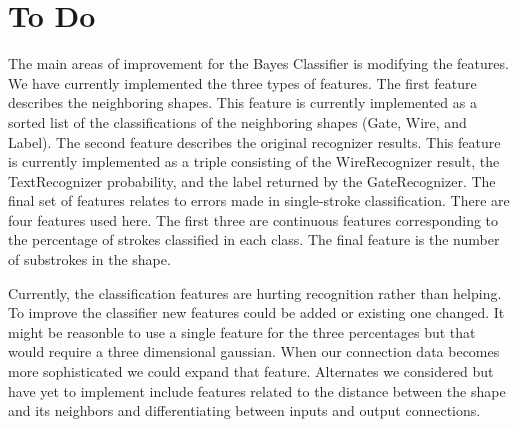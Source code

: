 \documentclass{article}
\begin{document}
\section{To Do}
The main areas of improvement for the Bayes Classifier is modifying the features.  We have currently implemented the three types of features.  The first feature describes the neighboring shapes.  This feature is currently implemented as a sorted list of the classifications of the neighboring shapes (Gate, Wire, and Label).  The second feature describes the original recognizer results.  This feature is currently implemented as a triple consisting of the WireRecognizer result, the TextRecognizer probability, and the label returned by the GateRecognizer.  The final set of features relates to errors made in single-stroke classification.  There are four features used here.  The first three are continuous features corresponding to the percentage of strokes classified in each class.  The final feature is the number of substrokes in the shape.  

Currently, the classification features are hurting recognition rather than helping.  To improve the classifier new features could be added or existing one changed.  It might be reasonble to use a single feature for the three percentages but that would require a three dimensional gaussian.  When our connection data becomes more sophisticated we could expand that feature.  Alternates we considered but have yet to implement include features related to the distance between the shape and its neighbors and differentiating between inputs and output connections.   
\end{document}
